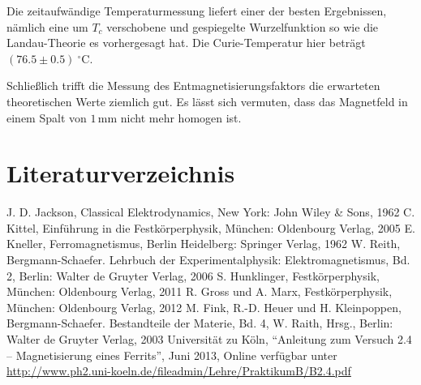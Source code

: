 \documentclass[12pt,a4paper]{scrartcl}
\numberwithin{equation}{section} %
\begin{document}
Die zeitaufwändige Temperaturmessung liefert einer der besten Ergebnissen, nämlich eine um $T_{c}$ verschobene und gespiegelte Wurzelfunktion so wie die Landau-Theorie es vorhergesagt hat. Die Curie-Temperatur hier beträgt $(76.5 \pm 0.5) \ ^\circ\mathrm C$.

Schließlich trifft die Messung des Entmagnetisierungsfaktors die erwarteten theoretischen Werte ziemlich gut. Es lässt sich vermuten, dass das Magnetfeld in einem Spalt von $1\mathrm{\,mm}$ nicht mehr homogen ist.

\clearpage
\hypertarget{literaturverzeichnis}{%
\section{Literaturverzeichnis}\label{literaturverzeichnis}}
\begin{thebibliography}{9}
J. D. Jackson, Classical Elektrodynamics, New York: John Wiley \& Sons, 1962
		C. Kittel, Einführung in die Festkörperphysik, München: Oldenbourg Verlag, 2005
		E. Kneller, Ferromagnetismus, Berlin Heidelberg: Springer Verlag, 1962
		W. Reith, Bergmann-Schaefer. Lehrbuch der Experimentalphysik: Elektromagnetismus, Bd. 2, Berlin: Walter de Gruyter Verlag, 2006
		S. Hunklinger, Festkörperphysik, München: Oldenbourg Verlag, 2011
		R. Gross und A. Marx, Festkörperphysik, München: Oldenbourg Verlag, 2012
		M. Fink, R.-D. Heuer und H. Kleinpoppen, Bergmann-Schaefer. Bestandteile der Materie, Bd. 4, W. Raith, Hrsg., Berlin: Walter de Gruyter Verlag, 2003
		Universität zu Köln, ``Anleitung zum Versuch 2.4 -- Magnetisierung eines Ferrits'', Juni 2013, Online verfügbar unter \url{http://www.ph2.uni-koeln.de/fileadmin/Lehre/PraktikumB/B2.4.pdf}
\end{thebibliography}
\end{document}
